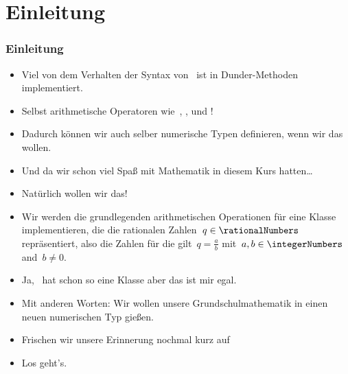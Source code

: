 \documentclass[aspectratio=169,mathserif,notheorems]{beamer}%
\subtitle{46.~Klassen/Dunder:~Arithmetische Operatoren und Vergleiche}%
\begin{document}
%
%
\startPresentation%
%
\section{Einleitung}%
\begin{frame}[t]%
\frametitle{Einleitung}%
\begin{itemize}%
%
\item Viel von dem Verhalten der Syntax von \python\ ist in Dunder-Methoden implementiert.%
%
\item<2-> Selbst arithmetische Operatoren wie~\pythonilIdx{+}, \pythonilIdx{-}, \pythonilIdx{*} und \pythonilIdx{/}!
%
\item<3-> Dadurch können wir auch \alert{selber} numerische Typen definieren, wenn wir das wollen.%
%
\item<4-> Und da wir schon viel Spaß mit Mathematik in diesem Kurs hatten\dots%
%
\item<5-> \alert{Natürlich wollen wir das!}%
%
\item<6-> Wir werden die grundlegenden arithmetischen Operationen für eine Klasse  implementieren, die die rationalen Zahlen~$q\in\rationalNumbers$ repräsentiert, also die Zahlen für die gilt~$q=\frac{a}{b}$ mit~$a,b\in\integerNumbers$ and~$b\neq0$.%
%
\item<7-> Ja, \python\ hat schon so eine Klasse\cite{PSF:P3D:TPSL:FRN} aber das ist mir egal.%
%
\item<8-> Mit anderen Worten: Wir wollen unsere Grundschulmathematik in einen neuen numerischen Typ gießen.%
%
\item<9-> Frischen wir unsere Erinnerung nochmal kurz auf%
\item<12-> Los geht's.%
\end{itemize}%
\end{frame}%
%
\end{document}
